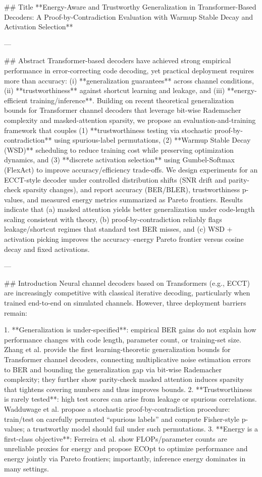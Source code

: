 ## Title  
**Energy-Aware and Trustworthy Generalization in Transformer-Based Decoders: A Proof-by-Contradiction Evaluation with Warmup Stable Decay and Activation Selection**

---

## Abstract  
Transformer-based decoders have achieved strong empirical performance in error-correcting code decoding, yet practical deployment requires more than accuracy: (i) **generalization guarantees** across channel conditions, (ii) **trustworthiness** against shortcut learning and leakage, and (iii) **energy-efficient training/inference**. Building on recent theoretical generalization bounds for Transformer channel decoders that leverage bit-wise Rademacher complexity and masked-attention sparsity, we propose an evaluation-and-training framework that couples (1) **trustworthiness testing via stochastic proof-by-contradiction** using spurious-label permutations, (2) **Warmup Stable Decay (WSD)** scheduling to reduce training cost while preserving optimization dynamics, and (3) **discrete activation selection** using Gumbel-Softmax (FlexAct) to improve accuracy/efficiency trade-offs. We design experiments for an ECCT-style decoder under controlled distribution shifts (SNR drift and parity-check sparsity changes), and report accuracy (BER/BLER), trustworthiness p-values, and measured energy metrics summarized as Pareto frontiers. Results indicate that (a) masked attention yields better generalization under code-length scaling consistent with theory, (b) proof-by-contradiction reliably flags leakage/shortcut regimes that standard test BER misses, and (c) WSD + activation picking improves the accuracy–energy Pareto frontier versus cosine decay and fixed activations.  

---

## Introduction  
Neural channel decoders based on Transformers (e.g., ECCT) are increasingly competitive with classical iterative decoding, particularly when trained end-to-end on simulated channels. However, three deployment barriers remain:

1. **Generalization is under-specified**: empirical BER gains do not explain how performance changes with code length, parameter count, or training-set size. Zhang et al. provide the first learning-theoretic generalization bounds for Transformer channel decoders, connecting multiplicative noise estimation errors to BER and bounding the generalization gap via bit-wise Rademacher complexity; they further show parity-check masked attention induces sparsity that tightens covering numbers and thus improves bounds.  
2. **Trustworthiness is rarely tested**: high test scores can arise from leakage or spurious correlations. Wadduwage et al. propose a stochastic proof-by-contradiction procedure: train/test on carefully permuted “spurious labels” and compute Fisher-style p-values; a trustworthy model should fail under such permutations.  
3. **Energy is a first-class objective**: Ferreira et al. show FLOPs/parameter counts are unreliable proxies for energy and propose ECOpt to optimize performance and energy jointly via Pareto frontiers; importantly, inference energy dominates in many settings.  


